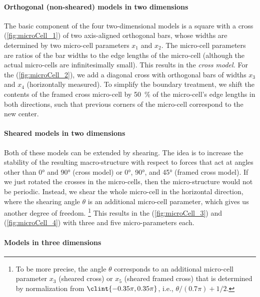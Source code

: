\paragraph{Orthogonal (non-sheared) models in two dimensions}

The basic component of the four two-dimensional models
is a square with a cross (\cref{fig:microCell_1})
of two axis-aligned orthogonal bars,
whose widths are determined by two micro-cell parameters $x_1$ and $x_2$.
The micro-cell parameters are ratios of the bar widths
to the edge lengths of the micro-cell
(although the actual micro-cells are infinitesimally small).
This results in the \emph{cross model.}
For the  (\cref{fig:microCell_2}),
we add a diagonal cross with orthogonal bars
of widths $x_3$ and $x_4$ (horizontally measured).
To simplify the boundary treatment,
we shift the contents of the framed cross micro-cell by
\SI{50}{\percent} of the micro-cell's edge lengths in both directions,
such that previous corners of the micro-cell correspond to the new center.

\paragraph{Sheared models in two dimensions}

Both of these models can be extended by shearing.
The idea is to increase the stability of the resulting macro-structure
with respect to forces that act at angles other than
\ang{0} and \ang{90} (cross model) or
\ang{0}, \ang{90}, and \ang{45} (framed cross model).
If we just rotated the crosses in the micro-cells,
then the micro-structure would not be periodic.
Instead, we shear the whole micro-cell in the horizontal direction,
where the shearing angle $\theta$ is an additional micro-cell parameter,
which gives us another degree of freedom.%
\footnote{%
  To be more precise, the angle $\theta$ corresponds to an
  additional micro-cell parameter $x_3$ (sheared cross) or
  $x_5$ (sheared framed cross) that is determined by normalization
  from $\clint{-0.35\pi, 0.35\pi}$, i.e., $\theta/(0.7\pi) + 1/2$.%
}
This results in the  (\cref{fig:microCell_3})
and  (\cref{fig:microCell_4})
with three and five micro-parameters each.

\paragraph{Models in three dimensions}

